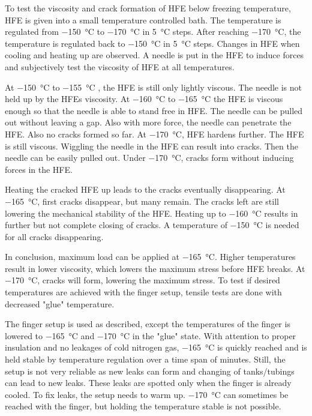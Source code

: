 To test the viscosity and crack formation of HFE below freezing temperature, HFE is given into a small temperature controlled bath. The temperature is regulated from \SI{-150}{\degreeCelsius} to \SI{-170}{\degreeCelsius} in \SI{5}{\degreeCelsius} steps. After reaching \SI{-170}{\degreeCelsius}, the temperature is regulated back to \SI{-150}{\degreeCelsius} in \SI{5}{\degreeCelsius} steps. Changes in HFE when cooling and heating up are observed. A needle is put in the HFE to induce forces and subjectively test the viscosity of HFE at all temperatures.

At \SI{-150}{\degreeCelsius} to \SI{-155}{\degreeCelsius} , the HFE is still only lightly viscous. The needle is not held up by the HFEs viscosity. At \SI{-160}{\degreeCelsius} to  \SI{-165}{\degreeCelsius} the HFE is viscous enough so that the needle is able to stand free in HFE. The needle can be pulled out without leaving a gap. Also with more force, the needle can penetrate the HFE. Also no cracks formed so far. At \SI{-170}{\degreeCelsius}, HFE hardens further. The HFE is still viscous. Wiggling the needle in the HFE can result into cracks. Then the needle can be easily pulled out. Under \SI{-170}{\degreeCelsius}, cracks form without inducing forces in the HFE.

Heating the cracked HFE up leads to the cracks eventually disappearing. At \SI{-165}{\degreeCelsius}, first cracks disappear, but many remain. The cracks left are still lowering the mechanical stability of the HFE. Heating up to \SI{-160}{\degreeCelsius} results in further but not complete closing of cracks. A temperature of \SI{-150}{\degreeCelsius} is needed for all cracks disappearing.

In conclusion, maximum load can be applied at \SI{-165}{\degreeCelsius}. Higher temperatures result in lower viscosity, which lowers the maximum stress before HFE breaks. At \SI{-170}{\degreeCelsius}, cracks will form, lowering the maximum stress. To test if desired temperatures are achieved with the finger setup, tensile tests are done with decreased "glue" temperature.

The finger setup is used as described, except the temperatures of the finger is lowered to \SI{-165}{\degreeCelsius} and \SI{-170}{\degreeCelsius} in the "glue" state. With attention to proper insulation and no leakages of cold nitrogen gas, \SI{-165}{\degreeCelsius} is quickly reached and is held stable by temperature regulation over a time span of minutes. Still, the setup is not very reliable as new leaks can form and changing of tanks/tubings can lead to new leaks. These leaks are spotted only when the finger is already cooled. To fix leaks, the setup needs to warm up. \SI{-170}{\degreeCelsius} can sometimes be reached with the finger, but holding the temperature stable is not possible. 


